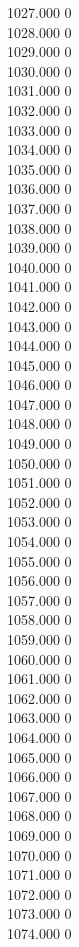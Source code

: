 { 1027.000	0 \\
 1028.000	0 \\
 1029.000	0 \\
 1030.000	0 \\
 1031.000	0 \\
 1032.000	0 \\
 1033.000	0 \\
 1034.000	0 \\
 1035.000	0 \\
 1036.000	0 \\
 1037.000	0 \\
 1038.000	0 \\
 1039.000	0 \\
 1040.000	0 \\
 1041.000	0 \\
 1042.000	0 \\
 1043.000	0 \\
 1044.000	0 \\
 1045.000	0 \\
 1046.000	0 \\
 1047.000	0 \\
 1048.000	0 \\
 1049.000	0 \\
 1050.000	0 \\
 1051.000	0 \\
 1052.000	0 \\
 1053.000	0 \\
 1054.000	0 \\
 1055.000	0 \\
 1056.000	0 \\
 1057.000	0 \\
 1058.000	0 \\
 1059.000	0 \\
 1060.000	0 \\
 1061.000	0 \\
 1062.000	0 \\
 1063.000	0 \\
 1064.000	0 \\
 1065.000	0 \\
 1066.000	0 \\
 1067.000	0 \\
 1068.000	0 \\
 1069.000	0 \\
 1070.000	0 \\
 1071.000	0 \\
 1072.000	0 \\
 1073.000	0 \\
 1074.000	0 \\
}
